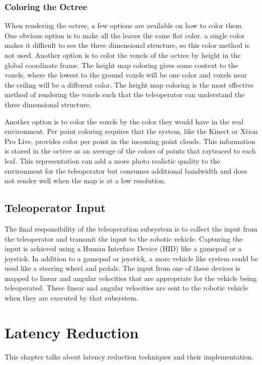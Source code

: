 \documentclass[12pt]{report}
\begin{document}
\subsection{Coloring the Octree}
When rendering the octree, a few options are available on how to color them.  One obvious option is to make all the leaves the same flat color.  a single color makes it difficult to see the three dimensional structure, so this color method is not used.  Another option is to color the voxels of the octree by height in the global coordinate frame.  The height map coloring gives some context to the voxels, where the lowest to the ground voxels will be one color and voxels near the ceiling will be a different color.  The height map coloring is the most effective method of rendering the voxels such that the teleoperator can understand the three dimensional structure.

Another option is to color the voxels by the color they would have in the real environment.  Per point coloring requires that the system, like the Kinect or Xtion Pro Live, provides color per point in the incoming point clouds.  This information is stored in the octree as an average of the colors of points that raytraced to each leaf.  This representation can add a more photo realistic quality to the environment for the teleoperator but consumes additional bandwidth and does not render well when the map is at a low resolution.

\section{Teleoperator Input}
The final responsibility of the teleoperation subsystem is to collect the input from the teleoperator and transmit the input to the robotic vehicle.  Capturing the input is achieved using a Human Interface Device (HID) like a gamepad or a joystick.  In addition to a gamepad or joystick, a more vehicle like system could be used like a steering wheel and pedals.  The input from one of these devices is mapped to linear and angular velocities that are appropriate for the vehicle being teleoperated.  These linear and angular velocities are sent to the robotic vehicle when they are executed by that subsystem.


\chapter{Latency Reduction}\label{chap:latency_reduction}
This chapter talks about latency reduction techniques and their implementation.
\end{document}
